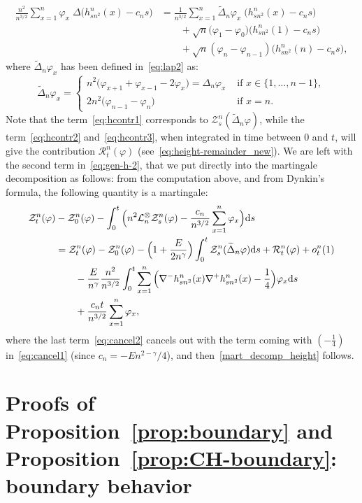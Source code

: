 \documentclass[AHL,Unicode,longabstracts]{cedram}
\newcommand{\mc}[1]{{\mathcal #1}}
\renewcommand{\mc}[1]{{\mathcal #1}}
\renewcommand{\tilde}{\widetilde}
\newcommand*{\dd}{\mathrm{d}}
\newcommand*{\ds}{\dd s}
\begin{document}
\begin{align}\label{eq:hcontr1}
\frac{n^2}{n^{3/2}} \sum_{x=1}^n \varphi_x \; \Delta \big(h_{sn^2}^n(x)-c_n s\big) &= \frac{1}{n^{3/2}}\sum_{x=1}^n \tilde\Delta_n\varphi_x\; \big(h^n_{sn^2}(x)-c_n s\big) \\
&\qquad +\sqrt n\big(\varphi_1-\varphi_0)\big(h_{sn^2}^n(1)-c_n s\big)\label{eq:hcontr2}\\
&\qquad + \sqrt n(\varphi_n-\varphi_{n-1})\big(h_{sn^2}^n(n)-c_n s \big),\label{eq:hcontr3}
\end{align}
where $\tilde\Delta_n\varphi_x$ has been defined in~\eqref{eq:lap2} as:
\[
\tilde\Delta_n\varphi_x =
\begin{cases}n^2\big(\varphi_{x+1} + \varphi_{x-1} - 2 \varphi_x\big)= \Delta_n\varphi_x & \text{ if } x \in \{1,\dots,n-1\},\\
2 n^2\big(\varphi_{n-1}-\varphi_n\big) & \text{ if }x=n.
\end{cases}
\]
Note that the term~\eqref{eq:hcontr1} corresponds to $\mc Z_s^n(\tilde\Delta_n\varphi)$, while the term~\eqref{eq:hcontr2} and~\eqref{eq:hcontr3}, when integrated in time between $0$ and $t$, will give the contribution $\mc R_t^n(\varphi)$ (see~\eqref{eq:height-remainder_new}). We are left with the second term in~\eqref{eq:gen-h-2}, that we put directly into the martingale decomposition as follows: from the computation above, and from Dynkin's formula, the following quantity is a martingale:
\begin{align}
\mc Z_t^n(\varphi) & -\mc Z_0^n(\varphi)- \int_0^t \Big(n^2 \mc L_n^\otimes \mc Z_s^n(\varphi) - \frac{c_n}{n^{3/2}}\sum_{x=1}^n\varphi_x\Big) \ds \notag \\
\notag & = \mc Z_t^n(\varphi) - \mc Z_0^n(\varphi) - \Big(1+\frac{E}{2n^\gamma} \Big)\int_0^t \mc Z_s^n(\tilde\Delta_n\varphi)\ds + \mc R_t^n(\varphi) +o^n_t(1)\\
& \qquad - \frac{E}{n^\gamma} \frac{n^2}{n^{3/2}} \int_0^t \sum_{x=1}^{n} \Big(\nabla^-h_{sn^2}^n(x)\nabla^+h_{sn^2}^n(x)-\frac14\Big)\varphi_x \ds \label{eq:cancel1}
\\
& \qquad + \frac{c_n t}{n^{3/2}} \sum_{x=1}^n \varphi_x,\label{eq:cancel2}
\end{align}
where the last term~\eqref{eq:cancel2} cancels out with the term coming with $(-\frac14)$ in~\eqref{eq:cancel1} (since $c_n = -En^{2-\gamma}/4$), and then~\eqref{mart_decomp_height} follows.


\section{Proofs of Proposition~\ref{prop:boundary} and Proposition~\ref{prop:CH-boundary}: boundary behavior}
\label{sec:proof-boundary}
\end{document}
